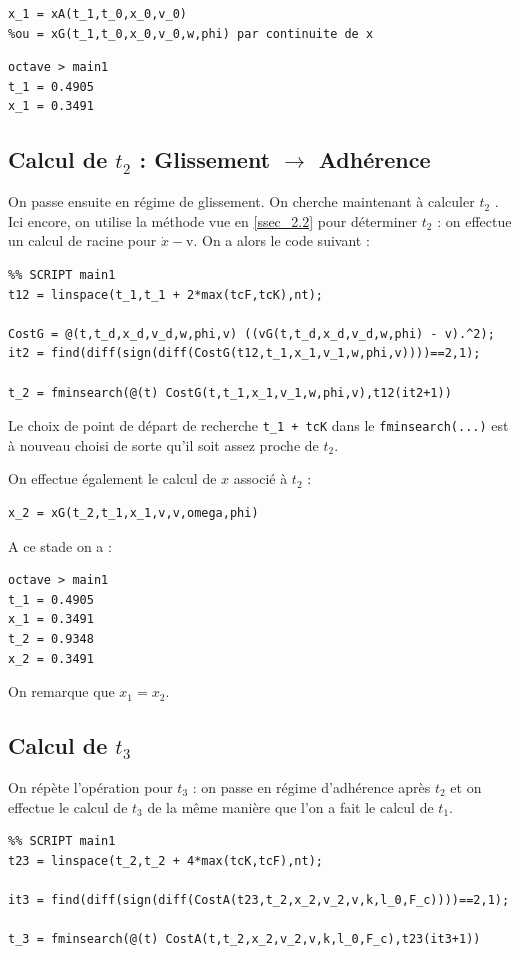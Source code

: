 \documentclass{article}
\begin{document}
\begin{lstlisting}
x_1 = xA(t_1,t_0,x_0,v_0) 
%ou = xG(t_1,t_0,x_0,v_0,w,phi) par continuite de x
\end{lstlisting}


\begin{lstlisting}
octave > main1
t_1 = 0.4905
x_1 = 0.3491
\end{lstlisting}


\subsection{Calcul de $t_2$ : Glissement $\rightarrow$ Adhérence}
On passe ensuite en régime de glissement. On cherche maintenant à calculer $t_2$ . Ici encore, on utilise la méthode vue en \ref{ssec_2.2} pour déterminer $t_2$ : on effectue un calcul de racine pour $\dot{x}-\text{v}$. On a alors le code suivant :

\begin{lstlisting}
%% SCRIPT main1
t12 = linspace(t_1,t_1 + 2*max(tcF,tcK),nt);

CostG = @(t,t_d,x_d,v_d,w,phi,v) ((vG(t,t_d,x_d,v_d,w,phi) - v).^2);
it2 = find(diff(sign(diff(CostG(t12,t_1,x_1,v_1,w,phi,v))))==2,1);

t_2 = fminsearch(@(t) CostG(t,t_1,x_1,v_1,w,phi,v),t12(it2+1))
\end{lstlisting}

Le choix de point de départ de recherche \verb|t_1 + tcK| dans le \verb|fminsearch(...)| est à nouveau choisi de sorte qu'il soit assez proche de $t_2$. 

On effectue également le calcul de $x$ associé à $t_2$ :

\begin{lstlisting}
x_2 = xG(t_2,t_1,x_1,v,v,omega,phi)
\end{lstlisting}

A ce stade on a :

\begin{lstlisting}
octave > main1
t_1 = 0.4905
x_1 = 0.3491
t_2 = 0.9348
x_2 = 0.3491
\end{lstlisting}

On remarque que $x_1=x_2$.

\subsection{Calcul de $t_3$}
On répète l'opération pour $t_3$ : on passe en régime d'adhérence après $t_2$ et on effectue le calcul de $t_3$  de la même manière que l'on a fait le calcul de $t_1$. 
\begin{lstlisting}
%% SCRIPT main1
t23 = linspace(t_2,t_2 + 4*max(tcK,tcF),nt);

it3 = find(diff(sign(diff(CostA(t23,t_2,x_2,v_2,v,k,l_0,F_c))))==2,1);

t_3 = fminsearch(@(t) CostA(t,t_2,x_2,v_2,v,k,l_0,F_c),t23(it3+1))
\end{lstlisting}
 
\end{document}
